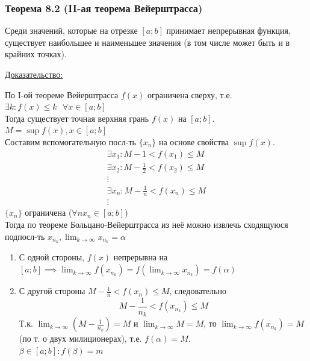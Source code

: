\documentclass[12pt]{article}
\def\posl#1#2{\{#1_{#2}\}}
\begin{document}
    \subsubsection*{Теорема 8.2 (II-ая теорема Вейерштрасса)}
    Среди значений, которые на отрезке $[a; b]$ принимает непрерывная функция, существует наибольшее и наименьшее значения (в том числе может быть и в крайних точках).\par\noindent
    \underline{Доказательство:}
    \begin{adjustwidth}{1.5em}{1.5em}
        По I-ой теореме Вейерштрасса $f(x)$ ограничена сверху, т.е. $\exists k : f(x) \le k \text{ }  \forall x \in [a; b]$\\
        Тогда существует точная верхняя грань $f(x)$ на $[a; b]$. $M = \sup f(x), x \in [a; b]$\\
        Составим вспомогательную посл-ть $\posl{x}{n}$ на основе свойства $\sup f(x)$.
        \begin{gather*}
            \exists x_1 : M - 1 < f(x_1) \le M\\
            \exists x_2 : M - \frac{1}{2} < f(x_2) \le M\\
            \vdots\\
            \exists x_n : M - \frac{1}{n} < f(x_n) \le M\\
            \vdots
        \end{gather*}
        $\posl{x}{n}$ ограничена ($\forall n x_n \in [a; b]$)\\
        Тогда по теореме Больцано-Вейерштрасса из неё можно извлечь сходящуюся подпосл-ть $x_{n_k}, \lim_{k\to\infty}x_{n_k} = \alpha$
        \begin{enumerate}
            \item С одной стороны, $f(x)$ непрерывна на $[a; b] \implies \lim_{k\to\infty}f(x_{n_k}) = f(\lim_{k\to\infty}x_{n_k}) = f(\alpha)$
            \item С другой стороны $M - \frac{1}{n} < f(x_n) \le M$, следовательно
            \[
                M - \frac{1}{n_k} < f(x_{n_k}) \le M
            \]
            Т.к. $\lim_{k\to\infty} (M - \frac{1}{n_k}) = M$ и $\lim_{k\to\infty} M = M$, то $\lim_{k\to\infty}f(x_{n_k}) = M$ (по т. о двух милиционерах), т.е. $f(\alpha) = M$.\\
            $\beta \in [a; b] : f(\beta) = m$
        \end{enumerate}
    \end{adjustwidth}
\end{document}
